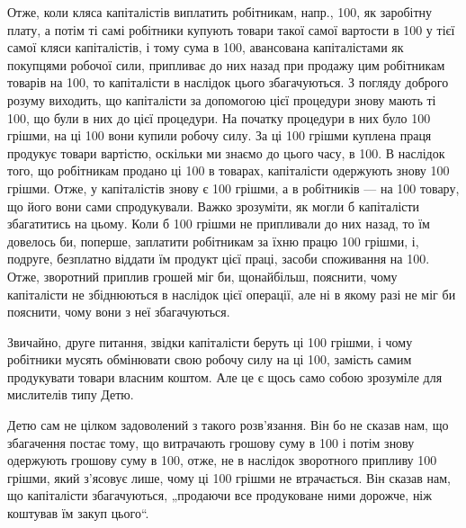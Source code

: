 Отже, коли кляса капіталістів виплатить робітникам, напр., 100,
як заробітну плату, а потім ті самі робітники купують товари такої самої
вартости в 100 у тієї самої кляси капіталістів, і тому сума
в 100, авансована капіталістами як покупцями робочої сили,
припливає до них назад при продажу цим робітникам товарів на 100, то капіталісти в наслідок цього збагачуються. З погляду
доброго розуму виходить, що капіталісти за допомогою цієї процедури
знову мають ті 100, що були в них до цієї процедури. На
початку процедури в них було 100 грішми, на ці 100
вони купили робочу силу. За ці 100 грішми куплена праця
продукує товари вартістю, оскільки ми знаємо до цього часу, в 100. В наслідок того, що робітникам продано ці 100 в товарах,
капіталісти одержують знову 100 грішми. Отже, у капіталістів
знову є 100 грішми, а в робітників — на 100
товару, що його вони сами спродукували. Важко зрозуміти, як могли б
капіталісти збагатитись на цьому. Коли б 100 грішми не припливали
до них назад, то їм довелось би, поперше, заплатити робітникам
за їхню працю 100 грішми, і, подруге, безплатно віддати
їм продукт цієї праці, засоби споживання на 100. Отже, зворотний
приплив грошей міг би, щонайбільш, пояснити, чому капіталісти
не збіднюються в наслідок цієї операції, але ні в якому разі не міг би
пояснити, чому вони з неї збагачуються.

Звичайно, друге питання, звідки капіталісти беруть ці 100
грішми, і чому робітники мусять обмінювати свою робочу силу на ці 100, замість самим продукувати товари власним коштом. Але це є щось
само собою зрозуміле для мислителів типу Детю.

Детю сам не цілком задоволений з такого розв’язання. Він бо не
сказав нам, що збагачення постає тому, що витрачають грошову суму
в 100 і потім знову одержують грошову суму в 100,
отже, не в наслідок зворотного припливу 100 грішми, який
з’ясовує лише, чому ці 100 грішми не втрачається. Він сказав
нам, що капіталісти збагачуються, „продаючи все продуковане ними
дорожче, ніж коштував їм закуп цього“.

